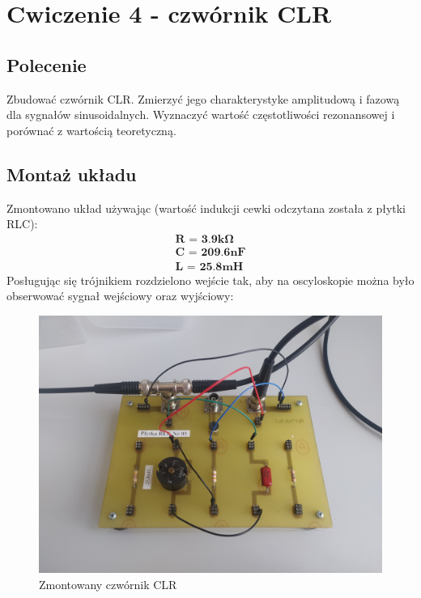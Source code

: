 \chapter{Cwiczenie 4 - czwórnik CLR}

\section{Polecenie}

Zbudować czwórnik CLR. Zmierzyć jego charakterystyke amplitudową i fazową dla sygnałów sinusoidalnych. Wyznaczyć wartość częstotliwości rezonansowej i porównać z wartością teoretyczną.

\section{Montaż układu}

Zmontowano układ używając (wartość indukcji cewki odczytana została z płytki RLC): 
\begin{gather}
    \textbf{R = 3.9k}\boldsymbol{\Omega} \\
    \textbf{C = 209.6nF} \\
    \textbf{L = 25.8mH}
\end{gather}
Posługując się trójnikiem rozdzielono wejście tak, aby na oscyloskopie można było obserwować sygnał wejściowy oraz wyjściowy:
    \begin{figure}[h]
        \centering
        \includegraphics[scale=0.15]{img_phone/IMG_20220330_114556_smaller.jpg}
        \caption{Zmontowany czwórnik CLR}
        \label{fig:builtCR}
    \end{figure}

